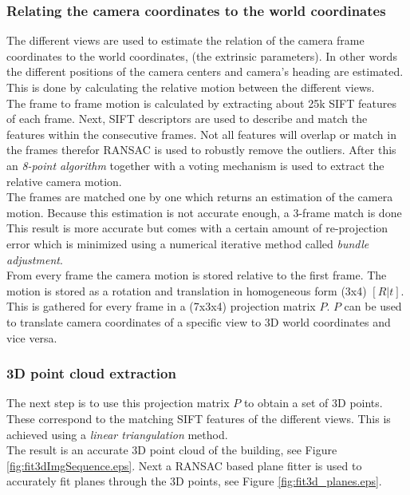 \subsubsection{Relating the camera coordinates to the world coordinates}
The different views are used to estimate the relation of the camera frame
coordinates to the world coordinates, (the extrinsic parameters).  In other
words the different positions of the camera centers and camera's heading are
estimated.  This is done by calculating the relative motion between the
different views.\\

The frame to frame motion is calculated by extracting about 25k SIFT features of
each frame.  Next, SIFT descriptors are used to describe and match the features
within the consecutive frames.  Not all features will overlap or match in the
frames therefor RANSAC is used to robustly remove the outliers.  After this an
\emph{8-point algorithm} together with a voting mechanism is used to extract the
relative camera motion.\\

The frames are matched one by one which returns an estimation of the camera
motion. Because this estimation is not accurate enough, a 3-frame match is done 
This result is more accurate but comes with a certain
amount of re-projection error which is minimized using a numerical
iterative method called \emph{bundle adjustment}.  \\

From every frame the camera motion is stored relative to the first frame.
The motion is stored as a rotation and translation in homogeneous
form (3x4) $[R|t]$. This is gathered for every frame in a (7x3x4) projection matrix $P$.
$P$ can be used to translate camera coordinates of a specific view 
 to 3D world coordinates and vice versa.

\subsubsection{3D point cloud extraction}
The next step is to use this projection matrix $P$ to obtain a set of 3D points.
These correspond to the matching SIFT features of the different views.  This
is achieved using a \emph{linear triangulation} method. \\
The result is an accurate 3D point cloud of the building, see Figure
\ref{fig:fit3dImgSequence.eps}.
Next a RANSAC based plane fitter is used to accurately fit planes through
the 3D points, see Figure \ref{fig:fit3d_planes.eps}.\\


